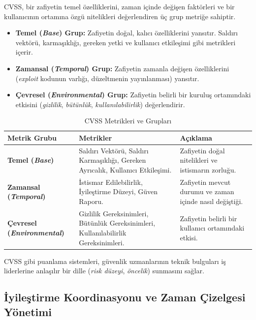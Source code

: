 CVSS, bir zafiyetin temel özelliklerini, zaman içinde değişen faktörleri ve bir kullanıcının ortamına özgü nitelikleri değerlendiren üç grup metriğe sahiptir.

\begin{itemize}
\item \textbf{Temel (\textit{Base}) Grup:} Zafiyetin doğal, kalıcı özelliklerini yansıtır. Saldırı vektörü, karmaşıklığı, gereken yetki ve kullanıcı etkileşimi gibi metrikleri içerir.
\item \textbf{Zamansal (\textit{Temporal}) Grup:} Zafiyetin zamanla değişen özelliklerini (\textit{exploit} kodunun varlığı, düzeltmenin yayınlanması) yansıtır.
\item \textbf{Çevresel (\textit{Environmental}) Grup:} Zafiyetin belirli bir kuruluş ortamındaki etkisini (\textit{gizlilik}, \textit{bütünlük}, \textit{kullanılabilirlik}) değerlendirir.
\end{itemize}

\begin{table}[h]
\centering
\begin{tabularx}{\textwidth}{|X|X|X|}
\hline
\rowcolor{tableheadcolor}
\textbf{Metrik Grubu} & \textbf{Metrikler} & \textbf{Açıklama} \\
\hline
\textbf{Temel (\textit{Base})} & Saldırı Vektörü, Saldırı Karmaşıklığı, Gereken Ayrıcalık, Kullanıcı Etkileşimi. & Zafiyetin doğal nitelikleri ve istismarın zorluğu. \\
\hline
\textbf{Zamansal (\textit{Temporal})} & İstismar Edilebilirlik, İyileştirme Düzeyi, Güven Raporu. & Zafiyetin mevcut durumu ve zaman içinde nasıl değiştiği. \\
\hline
\textbf{Çevresel (\textit{Environmental})} & Gizlilik Gereksinimleri, Bütünlük Gereksinimleri, Kullanılabilirlik Gereksinimleri. & Zafiyetin belirli bir kullanıcı ortamındaki etkisi. \\
\hline
\end{tabularx}
\caption{CVSS Metrikleri ve Grupları}
\label{tab:cvss_metrics}
\end{table}

CVSS gibi puanlama sistemleri, güvenlik uzmanlarının teknik bulguları iş liderlerine anlaşılır bir dille (\textit{risk düzeyi}, \textit{öncelik}) sunmasını sağlar.

\subsection{İyileştirme Koordinasyonu ve Zaman Çizelgesi Yönetimi}

